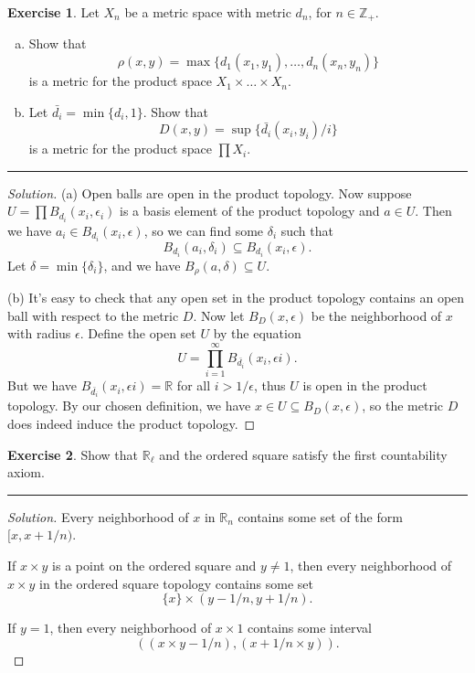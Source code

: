 \documentclass{article}
\theoremstyle{definition}
\newtheorem{exercise}{Exercise}[section]
\begin{document}
\begin{exercise}
  Let $X_n$ be a metric space with metric $d_n$, for $n\in\mathbb{Z}_+$.
  \begin{enumerate}[(a)]
    \item Show that
    $$\rho(x,y) = \max\{d_1(x_1,y_1),\dots,d_n(x_n,y_n)\}$$
    is a metric for the product space $X_1\times \dots \times X_n$.
    \item Let $\bar{d_i} = \min\{d_i,1\}$. Show that
    $$D(x,y) = \sup\{\bar{d_i}(x_i,y_i)/i\}$$
    is a metric for the product space $\prod X_i$.
  \end{enumerate}
\end{exercise}
\hrule
\begin{proof}[Solution]
  (a) Open balls are open in the product topology. Now suppose $U = \prod B_{d_i}(x_i, \epsilon_i)$ is a basis element of the product topology and $a\in U$. Then we have $a_i \in B_{d_i}(x_i, \epsilon)$, so we can find some $\delta_i$ such that
  $$B_{d_i}(a_i, \delta_i) \subseteq B_{d_i}(x_i, \epsilon).$$
  Let $\delta = \min\{\delta_i\}$, and we have $B_\rho(a, \delta)\subseteq U$.

  (b) It's easy to check that any open set in the product topology contains an open ball with respect to the metric $D$. Now let $B_D(x,\epsilon)$ be the neighborhood of $x$ with radius $\epsilon$. Define the open set $U$ by the equation
  $$U = \prod_{i=1}^{\infty}B_{\bar{d_i}}(x_i,\epsilon i).$$
  But we have $B_{\bar{d_i}}(x_i,\epsilon i) = \mathbb{R}$ for all $i > 1/\epsilon$, thus $U$ is open in the product topology. By our chosen definition, we have $x\in U\subseteq B_D(x,\epsilon)$, so the metric $D$ does indeed induce the product topology.
\end{proof}

\pagebreak

\begin{exercise}
  Show that $\mathbb{R}_\ell$ and the ordered square satisfy the first countability axiom.
\end{exercise}
\hrule
\begin{proof}[Solution]
  Every neighborhood of $x$ in $\mathbb{R}_n$ contains some set of the form $[x, x+1/n)$.

  If $x\times y$ is a point on the ordered square and $y\ne 1$, then every neighborhood of $x\times y$ in the ordered square topology contains some set $$\{x\}\times(y-1/n, y+1/n).$$

  If $y = 1$, then every neighborhood of $x\times 1$ contains some interval $$((x\times y-1/n), (x+1/n\times y)).$$
\end{proof}
\end{document}
